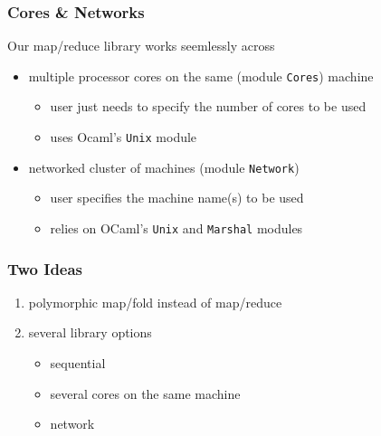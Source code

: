 \documentclass{beamer}
\begin{document}
\begin{frame}\frametitle{Cores \& Networks}
  Our map/reduce library works seemlessly across

  \bigskip
  \begin{itemize}
  \item multiple processor cores on the same (module \texttt{Cores})
    machine
    \begin{itemize}
    \item user just needs to specify the number of cores to be used
    \item uses Ocaml's \texttt{Unix} module
    \end{itemize}

    \bigskip
  \item networked cluster of machines (module \texttt{Network})
    \begin{itemize}
    \item user specifies the machine name(s) to be used
    \item relies on OCaml's \texttt{Unix} and \texttt{Marshal} modules
    \end{itemize}
  \end{itemize}
\end{frame}


\begin{frame}\frametitle{Two Ideas}
  \begin{enumerate}
  \item polymorphic map/fold instead of map/reduce

    \bigskip
  \item several library options
    \begin{itemize}
    \item sequential 
    \item several cores on the same machine
    \item network
    \end{itemize}
  \end{enumerate}
\end{frame}
\end{document}
